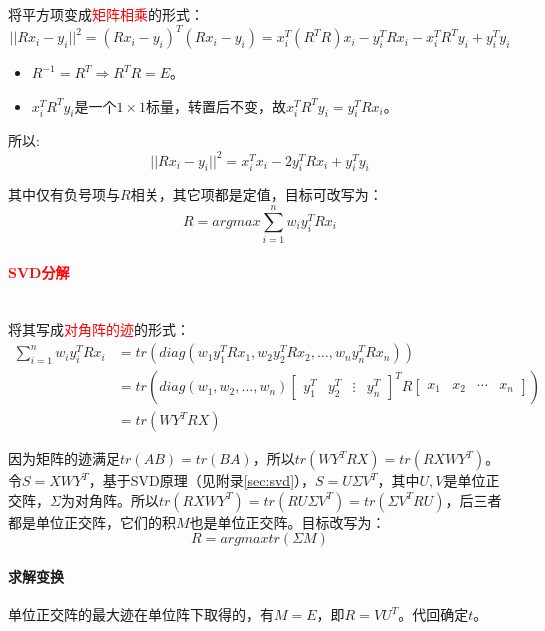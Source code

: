 \documentclass[
12pt, %
a4paper, 
oneside, %
]{scrartcl}
\begin{document}
将平方项变成\textcolor{red}{矩阵相乘}的形式：
$$ ||R x_i - y_i||^2 = (R x_i - y_i)^T(R x_i - y_i) = x_i^T (R^T R) x_i - y_i^T R x_i - x_i^T R^T y_i + y_i^T y_i $$
\begin{itemize}
\item $ R^{-1} = R^T \Rightarrow R^T R = E $。
\item $ x_i^T R^T y_i $是一个$ 1 \times 1 $标量，转置后不变，故$ x_i^T R^T y_i = y_i^T R x_i $。
\end{itemize}

所以:
$$ ||R x_i - y_i||^2 = x_i^T x_i - 2 y_i^T R x_i + y_i^T y_i $$

其中仅有负号项与$ R $相关，其它项都是定值，目标可改写为：
$$ R = argmax \sum_{i = 1}^{n}w_i y_i^T R x_i $$
\paragraph{\textcolor{red}{SVD分解}}\label{sec:svd back}~\\

将其写成\textcolor{red}{对角阵的迹}的形式：
\begin{align*}
\sum_{i = 1}^{n} w_i y_i^T R x_i 
&= tr(diag(w_1 y_1^T R x_1, w_2 y_2^T R x_2, \dots, w_n y_n^T R x_n)) \\
&= tr(diag(w_1, w_2, \dots, w_n) \begin{bmatrix} y_1^T & y_2^T & \vdots & y_n^T \end{bmatrix}^T R \begin{bmatrix} x_1 & x_2 & \cdots & x_n \end{bmatrix}) \\
&= tr(W Y^T R X)
\end{align*}

因为矩阵的迹满足$ tr(AB) = tr(BA) $，所以$ tr(W Y^T R X) = tr(R X W Y^T) $。令$ S = X W Y^T $，基于SVD原理（见附录\ref{sec:svd}），$ S = U \Sigma V^T $，其中$ U, V $是单位正交阵，$ \Sigma $为对角阵。所以$ tr(R X W Y^T) = tr(R U \Sigma V^T) = tr(\Sigma V^T R U) $，后三者都是单位正交阵，它们的积$ M $也是单位正交阵。目标改写为：
$$ R = argmax tr(\Sigma M) $$
\paragraph{求解变换}
单位正交阵的最大迹在单位阵下取得的，有$ M = E $，即$ R = V U^T $。代回确定$ t $。
\end{document}
